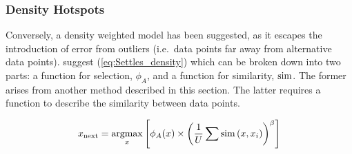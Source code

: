 




\subsubsection{Density Hotspots}
\label{sec:litRevDH}
Conversely, a density weighted model has been suggested, as it escapes the introduction of error from outliers (i.e.\ data points far away from alternative data points). \textcite{Set08} suggest (\ref{eq:Settles_density}) which can be broken down into two parts: a function for selection, $\phi_A$, and a function for similarity, $\operatorname*{sim}$. The former arises from  another method described in this section. The latter requires a function to describe the similarity between data points.

\begin{equation}
  \label{eq:Settles_density}
  x_\mathrm{next}=\operatorname*{argmax}_x{\left[\phi_A(x)\times{\left(\frac{1}{U}\sum{\operatorname*{sim}{(x, x_i)}}\right)}^\beta\right]}
\end{equation}

